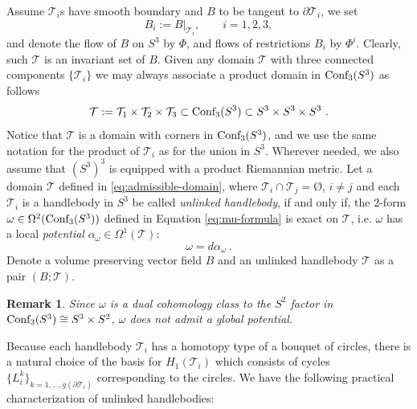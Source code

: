 \documentclass[12pt]{article}
\numberwithin{equation}{section}
\newtheorem{rem}[theorem]{Remark}
\newenvironment{remark}{\begin{rem} \rm}{\end{rem}}
\newcommand{\Cnf}{\text{\rm Conf}}
\newcommand{\no}{\noindent}
\begin{document}
\no Assume $\mathcal{T}_i$s  have smooth boundary and $B$ to be tangent to $\partial \mathcal{T}_i$, we set
\[
 B_i:=B\bigl|_{\mathcal{T}_i},\qquad i=1,2,3,
\]
 and denote the flow of $B$ on $S^3$ by $\Phi$, and flows of restrictions $B_i$ by $\Phi^i$.  Clearly,
 such $\mathcal{T}$ is an invariant set of $B$.
 Given any domain $\mathcal{T}$ with three connected components $\{\mathcal{T}_i\}$ we may always associate a product domain in $\Cnf_3(S^3)$ as follows
\begin{equation}\label{eq:admissible-domain}
 \mathcal{T}:=\mathcal{T}_1\times \mathcal{T}_2\times \mathcal{T}_3\subset \Cnf_3(S^3)\subset S^3\times S^3\times S^3\ .
\end{equation}
Notice that $\mathcal{T}$ is a domain with corners in $\Cnf_3(S^3)$, and we use the same notation for the product of $\mathcal{T}_i$ as for the union in $S^3$. Wherever needed, we also assume that 
$(S^3)^3$ is equipped with a product Riemannian metric.
 Let a domain $\mathcal{T}$ defined in \eqref{eq:admissible-domain}, where $\mathcal{T}_i\cap \mathcal{T}_j=$\O, $i\neq j$ and each $\mathcal{T}_i$ is a handlebody in $S^3$ be called \emph{unlinked handlebody}, if and only if, the 2-form $\omega\in\Omega^2(\Cnf_3(S^3))$ defined in Equation \eqref{eq:mu-formula} is exact on $\mathcal{T}$, i.e. $\omega$ has a local \emph{potential} $\alpha_\omega\in \Omega^1(\mathcal{T})$: 
\begin{equation}\label{eq:omega-exact}
 \omega=d\alpha_\omega\ .
\end{equation}
Denote a volume preserving vector field $B$ and an unlinked handlebody $\mathcal{T}$ as a pair $(B;\mathcal{T})$.


\begin{remark}
\no Since $\omega$ is a dual cohomology class to the $S^2$ factor in $\Cnf_3(S^3)\cong S^3\times S^2$,  $\omega$ does not admit a global potential.
\end{remark}
\no Because each handlebody $\mathcal{T}_i$ has a homotopy type of a bouquet of circles, there is a natural choice of the basis for $H_1(\mathcal{T}_i)$ which consists of cycles $\{L^k_i\}_{k=1,\ldots,g(\partial\mathcal{T}_i)}$ corresponding to the circles. We have the following practical characterization of unlinked handlebodies:
\end{document}
